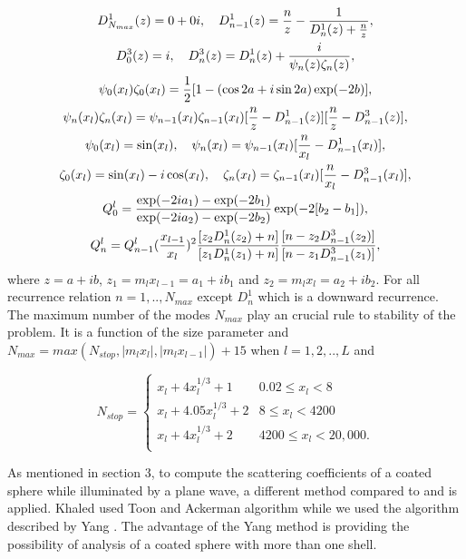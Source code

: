 \documentclass{osa-article}
\begin{document}
\begin{appendices}
\begin{equation}\label{eq3_b}
\begin{gathered}
D^1_{N_{max}}(z)=0+0i,\hspace{1em plus0.5em}
D^1_{n-1}(z)=\frac{n}{z}-\frac{1}{D^1_{n}(z)+\frac{n}{z}},\\
D^3_0(z)=i,\hspace{1em plus0.5em} D^3_{n}(z)=D^1_{n}(z)+\frac{i}{\psi_n(z)\zeta_n(z)},\\
\psi_0(x_l)\zeta_0(x_l)=\frac{1}{2}[1-(\cos 2a+i\sin 2a)\exp(-2b)],\\
\psi_n(x_l)\zeta_n(x_l)=\psi_{n-1}(x_l)\zeta_{n-1}(x_l)[\frac{n}{z}-D^1_{n-1}(z)][\frac{n}{z}-D^3_{n-1}(z)],\\
\psi_0(x_l)=\sin(x_l),\hspace{1em plus0.5em}\psi_n(x_l)=\psi_{n-1}(x_l)[\frac{n}{x_l}-D^1_{n-1}(x_l)],\\
\zeta_0(x_l)=\sin(x_l)-i\cos(x_l),\hspace{1em plus0.5em}\zeta_n(x_l)=\zeta_{n-1}(x_l)[\frac{n}{x_l}-D^3_{n-1}(x_l)],\\
Q^l_0=\frac{\exp(-2ia_1)-\exp(-2b_1)}{\exp(-2ia_2)-\exp(-2b_2)}\exp(-2[b_2-b_1]),\\
Q^l_n=Q^l_{n-1}(\frac{x_{l-1}}{x_l})^2\frac{[z_2D^1_n(z_2)+n]}{[z_1D^1_n(z_1)+n]}\frac{[n-z_2D^3_{n-1}(z_2)]}{[n-z_1D^3_{n-1}(z_1)]},
\end{gathered}
\end{equation}
where $z=a+ib$, $z_1=m_lx_{l-1}=a_1+ib_1$ and $z_2=m_lx_l=a_2+ib_2$. For all recurrence relation $n=1,..,N_{max}$ except $D^1_n$ which is a downward recurrence. The maximum number of the modes $N_{max}$ play an crucial rule to stability of the problem. It is a function of the size parameter and $N_{max}=max(N_{stop},|m_lx_l|,|m_lx_{l-1}|)+15$ when $l=1,2,..,L$ and 

\begin{equation}\label{eq30}
N_{stop}=\begin{cases}x_l+4x_l^{1/3}+1 & 0.02 \leq x_l< 8\\
x_l+4.05x_l^{1/3}+2 & 8\leq x_l< 4200\\
x_l+4x_l^{1/3}+2 & 4200\leq x_l< 20,000.\\
\end{cases}
\end{equation}

As mentioned in section 3, to compute the scattering coefficients of a coated sphere while illuminated by a plane wave, a different method compared to \cite{esam93} and \cite{esam94} is applied. Khaled used Toon and Ackerman \cite{Toon} algorithm while we used the algorithm described by Yang \cite{Yang}. The advantage of the Yang method is providing the possibility of analysis of a coated sphere with more than one shell. 



\end{appendices}
\end{document}
